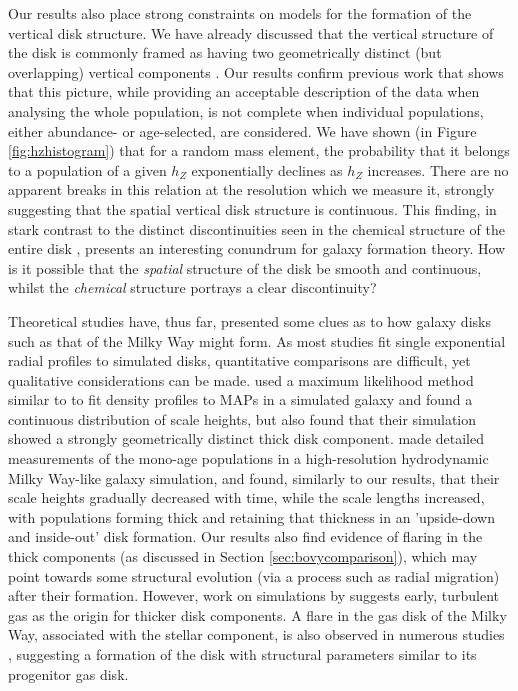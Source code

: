 Our results also place strong constraints on models for the formation of the vertical disk structure. We have already discussed that the vertical structure of the disk is commonly framed as having two geometrically distinct (but overlapping) vertical components \citep[e.g.][]{1983MNRAS.202.1025G}. Our results confirm previous work \citep[e.g.][]{2012ApJ...751..131B} that shows that this picture, while providing an acceptable description of the data when analysing the whole population, is not complete when individual populations, either abundance- or age-selected, are considered. We have shown (in Figure \ref{fig:hzhistogram}) that for a random mass element, the probability that it belongs to a population of a given $h_Z$ exponentially declines as $h_Z$ increases. There are no apparent breaks in this relation at the resolution which we measure it, strongly suggesting that the spatial vertical disk structure is continuous. This finding, in stark contrast to the distinct discontinuities seen in the chemical structure of the entire disk \citep[e.g][]{2014ApJ...796...38N,2015ApJ...808..132H}, presents an interesting conundrum for galaxy formation theory. How is it possible that the \emph{spatial} structure of the disk be smooth and continuous, whilst the \emph{chemical} structure portrays a clear discontinuity?

 Theoretical studies have, thus far, presented some clues as to how galaxy disks such as that of the Milky Way might form. As most studies fit single exponential radial profiles to simulated disks, quantitative comparisons are difficult, yet qualitative considerations can be made. \citet{2013MNRAS.436..625S} used a maximum likelihood method similar to \citet{2012ApJ...753..148B} to fit density profiles to MAPs in a simulated galaxy and found a continuous distribution of scale heights, but also found that their simulation showed a strongly geometrically distinct thick disk component. \citet{2013ApJ...773...43B} made detailed measurements of the mono-age populations in a high-resolution hydrodynamic Milky Way-like galaxy simulation, and found, similarly to our results, that their scale heights gradually decreased with time, while the scale lengths increased, with populations forming thick and retaining that thickness in an 'upside-down and inside-out' disk formation. Our results also find evidence of flaring in the thick components (as discussed in Section \ref{sec:bovycomparison}), which may point towards some structural evolution (via a process such as radial migration) after their formation. However, work on simulations by \citet{2009ApJ...707L...1B}  suggests early, turbulent gas as the origin for thicker disk components. A flare in the gas disk of the Milky Way, associated with the stellar component, is also observed in numerous studies \citep[e.g.][]{2014Natur.509..342F,2014ApJ...794...90K,1963SvA.....6..658L}, suggesting a formation of the disk with structural parameters similar to its progenitor gas disk.
 
